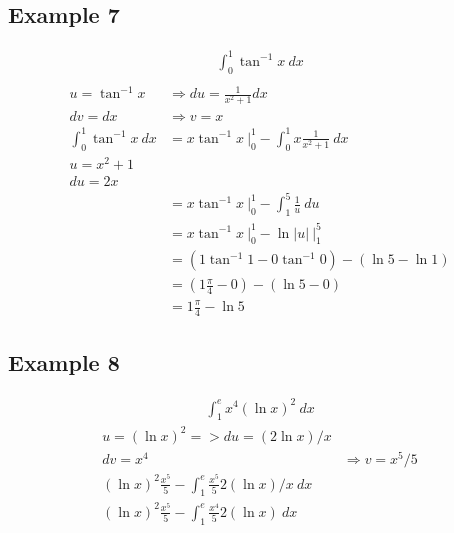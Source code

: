 \documentclass{article}
\theoremstyle{mytheoremstyle}
\theoremstyle{mytheoremstyle}
\theoremstyle{myproblemstyle}
\begin{document}
    \subsection*{Example 7}
    \begin{align*}
        \int_{0}^{1} \tan^{-1} x \ dx \\
    \end{align*}
    \begin{align*}
        u = \tan^{-1} x &\Rightarrow du = \frac{1}{x^2+1} dx \\
        dv = dx &\Rightarrow v = x \\
        \int_{0}^{1} \tan^{-1} x \ dx
        &= x \tan^{-1} x \ \Big|_{0}^{1} - \int_{0}^{1} x \frac{1}{x^2+1} \ dx \\
        u = x^2+1 \\
        du = 2x \\
        &= x \tan^{-1} x \ \Big|_{0}^{1} - \int_{1}^{5} \frac{1}{u} \ du \\
        &= x \tan^{-1} x \ \Big|_{0}^{1} - \ln|u| \ \Big|_{1}^{5} \\
        &= (1 \tan^{-1} 1 - 0 \tan^{-1} 0) - (\ln 5 - \ln 1) \\
        &= (1 \frac{\pi}{4} - 0) - (\ln5 - 0) \\
        &= 1 \frac{\pi}{4} - \ln5
    \end{align*}

    \subsection*{Example 8}
    \begin{align*}
        \int_{1}^{e} x^4(\ln x)^2 \ dx
    \end{align*}
    \begin{align*}
        u = (\ln x)^2 => du = (2 \ln x)/x \\
        dv = x^4 &\Rightarrow v = x^5/5 \\
        (\ln x)^2 \frac{x^5}{5} - \int_{1}^{e} \frac{x^5}{5} 2 (\ln x)/x \ dx \\
        (\ln x)^2 \frac{x^5}{5} - \int_{1}^{e} \frac{x^4}{5} 2 (\ln x) \ dx
    \end{align*}
\end{document}
